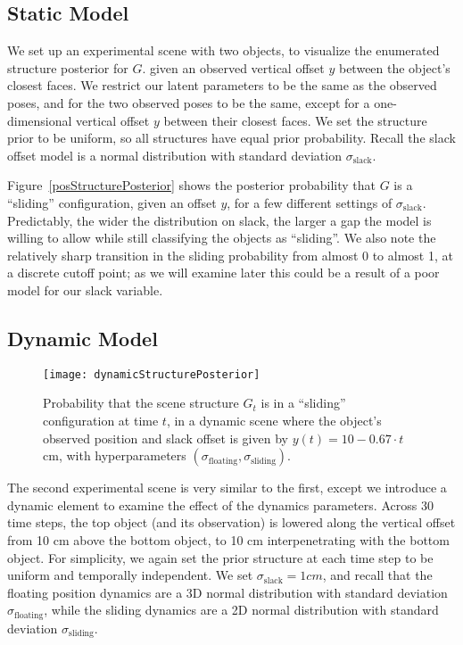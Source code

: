 \subsection{Static Model}
We set up an experimental scene with two objects, to visualize the enumerated structure posterior for $G$.
given an observed vertical offset $y$ between the object's closest faces.
We restrict our latent parameters to be the same as the observed poses, and for the two observed poses to be the same, except for a one-dimensional vertical offset $y$ between their closest faces.
We set the structure prior to be uniform, so all structures have equal prior probability.
Recall the slack offset model is a normal distribution with standard deviation $\sigma_\mathrm{slack}$.

Figure~\ref{posStructurePosterior} shows the posterior probability that $G$ is a ``sliding'' configuration, given an offset $y$, for a few different settings of $\sigma_\mathrm{slack}$.
Predictably, the wider the distribution on slack, the larger a gap the model is willing to allow while still classifying the objects as ``sliding''.
We also note the relatively sharp transition in the sliding probability from almost 0 to almost 1, at a discrete cutoff point; as we will examine later this could be a result of a poor model for our slack variable.

\subsection{Dynamic Model}
\begin{figure}[H]
  \texttt{[image: dynamicStructurePosterior]}
  \caption{
    Probability that the scene structure $G_t$ is in a ``sliding'' configuration at time $t$, in a dynamic scene where the object's observed position and slack offset is given by $y(t) = 10 - 0.67\cdot t$ cm, with hyperparameters $(\sigma_\mathrm{floating}, \sigma_\mathrm{sliding})$.
  }
  \label{fig:dynamicStructurePosterior}
\end{figure}
The second experimental scene is very similar to the first, except we introduce a dynamic element to examine the effect of the dynamics parameters.
Across 30 time steps, the top object (and its observation) is lowered along the vertical offset from 10 cm above the bottom object, to 10 cm interpenetrating with the bottom object.
For simplicity, we again set the prior structure at each time step to be uniform and temporally independent.
We set $\sigma_\mathrm{slack} = 1 cm$, and recall that the floating position dynamics are a 3D normal distribution with standard deviation $\sigma_\mathrm{floating}$, while the sliding dynamics are a 2D normal distribution with standard deviation $\sigma_\mathrm{sliding}$.

